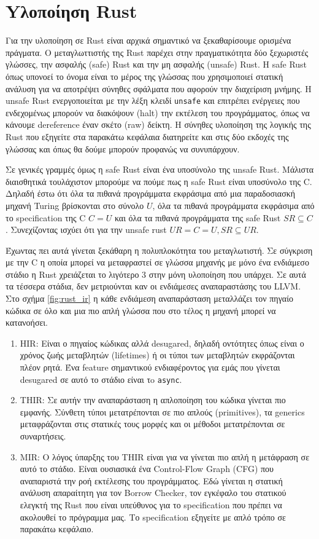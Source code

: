 \section{Yλοποίηση Rust}

Για την υλοποίηση σε Rust είναι αρχικά σημαντικό να ξεκαθαρίσουμε ορισμένα
πράγματα. Ο μεταγλωττιστής της Rust παρέχει στην πραγματικότητα δύο ξεχωριστές
γλώσσες, την ασφαλής (safe) Rust και την μη ασφαλής (unsafe) Rust. Η safe Rust
όπως υπονοεί το όνομα είναι το μέρος της γλώσσας που χρησιμοποιεί στατική ανάλυση
για να αποτρέψει σύνηθες σφάλματα που αφορούν την διαχείριση μνήμης. Η unsafe Rust
ενεργοποιείται με την λέξη κλειδί \verb|unsafe| και επιτρέπει ενέργειες που ενδεχομένως
μπορούν να διακόψουν (halt) την εκτέλεση του προγράμματος, όπως να κάνουμε dereference έναν
σκέτο (raw) δείκτη. Η σύνηθες υλοποίηση της λογικής της Rust που εξηγείτε στα παρακάτω κεφάλαια
διατηρείτε και στις δύο εκδοχές της γλώσσας και όπως θα δούμε μπορούν προφανώς να συνυπάρχουν.

Σε γενικές γραμμές όμως η safe Rust είναι ένα υποσύνολο της unsafe Rust. Μάλιστα διαισθητικά
τουλάχιστον μπορούμε να πούμε πως η safe Rust είναι υποσύνολο της C. Δηλαδή έστω ότι όλα τα πιθανά
προγράμματα εκφράσιμα από μια παραδοσιασκή μηχανή Turing βρίσκονται στο σύνολο $U$, όλα τα πιθανά
προγράμματα εκφράσιμα από το specification της C $C=U$ και όλα τα πιθανά προγράμματα της safe Rust $SR \subseteq C$.
Συνεχίζοντας ισχύει ότι για την unsafe rust $UR=C=U, SR \subseteq UR$. 

Έχωντας πει αυτά γίνεται ξεκάθαρη η πολυπλοκότητα του μεταγλωτιστή. Σε σύγκριση με την C η οποία 
μπορεί να μεταφραστεί σε γλώσσα μηχανής με μόνο ένα ενδιάμεσο στάδιο η Rust χρειάζεται το λιγότερο 3
στην μόνη υλοποίηση που υπάρχει. Σε αυτά τα τέσσερα στάδια, δεν μετριούνται καν οι ενδιάμεσες αναπαραστάσης
του LLVM. Στο σχήμα \ref{fig:rust_ir} η κάθε ενδιάμεση αναπαράσταση μεταλλάζει τον πηγαίο κώδικα σε όλο και
μια πιο απλή γλώσσα που στο τέλος η μηχανή μπορεί να κατανοήσει.

\begin{enumerate}
\item HIR: Είναι ο πηγαίος κώδικας αλλά desugared, δηλαδή οντότητες όπως είναι ο χρόνος
  ζωής μεταβλητών (lifetimes) ή οι τύποι των μεταβλητών εκφράζονται πλέον ρητά. Ένα
  feature σημαντικού ενδιαφέροντος για εμάς που γίνεται desugared σε αυτό το στάδιο είναι τo
  \verb|async|.
\item THIR: Σε αυτήν την αναπαράσταση η απλοποίηση του κώδικα γίνεται πιο εμφανής. Σύνθετη
  τύποι μετατρέπονται σε πιο απλούς (primitives), τα generics μεταφράζονται στις στατικές τους
  μορφές και οι μέθοδοι μετατρέπονται σε συναρτήσεις.
\item MIR: Ο λόγος ύπαρξης του THIR είναι για να γίνεται πιο απλή η μετάφραση σε αυτό το στάδιο.
  Είναι ουσιασικά ένα Control-Flow Graph (CFG) που αναπαριστά την ροή εκτέλεσης του προγράμματος.
  Εδώ γίνεται η στατική ανάλυση απαραίτητη για τον Borrow Checker, τον εγκέφαλο του στατικού ελεγκτή
  της Rust που είναι υπεύθυνος για το specification που πρέπει να ακολουθεί το πρόγραμμα μας. Το
  specification εξηγείτε με απλό τρόπο σε παρακάτω κεφάλαιο. 
\end{enumerate}

